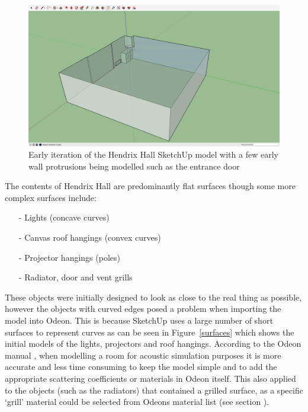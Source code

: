 \documentclass[../../main.tex]{subfiles}
\begin{document}
			\begin{figure}[ht]
				\center\includegraphics[scale = 0.2]{Sections/Implementation/Modelling/images/sku1.png}
				\caption{Early iteration of the Hendrix Hall SketchUp model with a few early wall protrusions being modelled such as the entrance door}
				\label{sku1}
			\end{figure}

			The contents of Hendrix Hall are predominantly flat surfaces though some more complex surfaces include:

			\begin{itemize}
				\item[-] Lights (concave curves) 
				\item[-] Canvas roof hangings (convex curves) 
				\item[-] Projector hangings (poles)
				\item[-] Radiator, door and vent grills \\
			\end{itemize}

			These objects were initially designed to look as close to the real thing as possible, however the objects with curved edges posed a problem when importing the model into Odeon. This is because SketchUp uses a large number of short surfaces to represent curves as can be seen in Figure~\ref{surfaces} which shows the initial models of the lights, projectors and roof hangings. According to the Odeon manual \cite{odeonManual}, when modelling a room for acoustic simulation purposes it is more accurate and less time consuming to keep the model simple and to add the appropriate scattering coefficients or materials in Odeon itself. This also applied to the objects (such as the radiators) that contained a grilled surface, as a specific `grill' material could be selected from Odeons material list (see section ).
\end{document}
